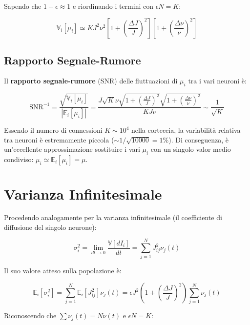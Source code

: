 Sapendo che $1 - \epsilon \approx 1$ e riordinando i termini con $\epsilon N = K$:

\begin{equation}
\mathbb{V}_i[\mu_i] \simeq K J^2 \nu^2 \left[ 1 + \left(\frac{\Delta J}{J}\right)^2 \right] \left[ 1 + \left(\frac{\Delta \nu}{\nu}\right)^2 \right]
\end{equation}

\subsection{Rapporto Segnale-Rumore}
Il \textbf{rapporto segnale-rumore} (SNR) delle fluttuazioni di $\mu_i$ tra i vari neuroni è:

\begin{equation}
\text{SNR}^{-1} = \frac{\sqrt{\mathbb{V}_i[\mu_i]}}{|\mathbb{E}_i[\mu_i]|} = \frac{J \sqrt{K} \nu \sqrt{1 + \left(\frac{\Delta J}{J}\right)^2} \sqrt{1 + \left(\frac{\Delta \nu}{\nu}\right)^2}}{K J \nu} \sim \frac{1}{\sqrt{K}}
\end{equation}

Essendo il numero di connessioni $K \sim 10^4$ nella corteccia, la variabilità relativa tra neuroni è estremamente piccola ($\sim 1/\sqrt{10000} = 1\%$). Di conseguenza, è un'eccellente approssimazione sostituire i vari $\mu_i$ con un singolo valor medio condiviso: $\mu_i \simeq \mathbb{E}_i[\mu_i] = \mu$.

\section{Varianza Infinitesimale}


Procedendo analogamente per la varianza infinitesimale (il coefficiente di diffusione del singolo neurone):

\begin{equation}
\sigma_i^2 = \lim_{dt \to 0} \frac{\mathbb{V}[dI_i]}{dt} = \sum_{j=1}^{N} J_{ij}^2 \nu_j(t)
\end{equation}

Il suo valore atteso sulla popolazione è:

\begin{equation}
\mathbb{E}_i[\sigma_i^2] = \sum_{j=1}^{N} \mathbb{E}_i[J_{ij}^2] \nu_j(t) = \epsilon J^2 \left( 1 + \left(\frac{\Delta J}{J}\right)^2 \right) \sum_{j=1}^{N} \nu_j(t)
\end{equation}

Riconoscendo che $\sum \nu_j(t) = N \nu(t)$ e $\epsilon N = K$:

